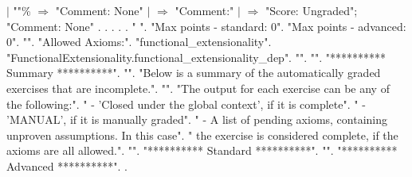 \documentclass[12pt]{report}
\begin{document}
\begin{coqdoccode}
\coqdocindent{4.00em}
     \coqdoceol
\coqdocindent{5.00em}
\ensuremath{|} ""\% \ensuremath{\Rightarrow}  "Comment: None"\coqdoceol
\coqdocindent{5.00em}
\ensuremath{|} \coqdocvar{\_} \ensuremath{\Rightarrow}  "Comment:" \coqdoceol
\coqdocindent{4.00em}
\coqdoceol
\coqdocindent{2.00em}
\ensuremath{|}  \ensuremath{\Rightarrow}\coqdoceol
\coqdocindent{4.00em}
 "Score: Ungraded";\coqdoceol
\coqdocindent{4.00em}
 "Comment: None"\coqdoceol
\coqdocindent{2.00em}
.\coqdoceol
\coqdocemptyline
\coqdocnoindent
{} .\coqdoceol
\coqdocemptyline
\coqdocnoindent
{}    .\coqdoceol
\coqdocnoindent
{} .\coqdoceol
\coqdocemptyline
\coqdocnoindent
{} .\coqdoceol
\coqdocemptyline
\coqdocnoindent
{} " ".\coqdoceol
\coqdocemptyline
\coqdocnoindent
{} "Max points - standard: 0".\coqdoceol
\coqdocnoindent
{} "Max points - advanced: 0".\coqdoceol
\coqdocnoindent
{} "".\coqdoceol
\coqdocnoindent
{} "Allowed Axioms:".\coqdoceol
\coqdocnoindent
{} "functional\_extensionality".\coqdoceol
\coqdocnoindent
{} "FunctionalExtensionality.functional\_extensionality\_dep".\coqdoceol
\coqdocnoindent
{} "".\coqdoceol
\coqdocnoindent
{} "".\coqdoceol
\coqdocnoindent
{} "********** Summary **********".\coqdoceol
\coqdocnoindent
{} "".\coqdoceol
\coqdocnoindent
{} "Below is a summary of the automatically graded exercises that are incomplete.".\coqdoceol
\coqdocnoindent
{} "".\coqdoceol
\coqdocnoindent
{} "The output for each exercise can be any of the following:".\coqdoceol
\coqdocnoindent
{} "  - 'Closed under the global context', if it is complete".\coqdoceol
\coqdocnoindent
{} "  - 'MANUAL', if it is manually graded".\coqdoceol
\coqdocnoindent
{} "  - A list of pending axioms, containing unproven assumptions. In this case".\coqdoceol
\coqdocnoindent
{} "    the exercise is considered complete, if the axioms are all allowed.".\coqdoceol
\coqdocnoindent
{} "".\coqdoceol
\coqdocnoindent
{} "********** Standard **********".\coqdoceol
\coqdocnoindent
{} "".\coqdoceol
\coqdocnoindent
{} "********** Advanced **********".\coqdoceol
\coqdocnoindent
{}.\coqdoceol
\coqdocemptyline
\coqdocemptyline
\end{coqdoccode}
\end{document}
